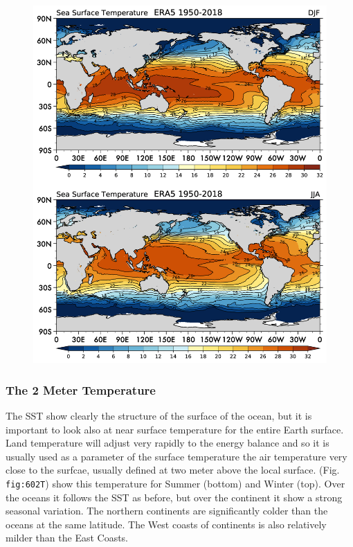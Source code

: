\begin{figure}
\centering
\includegraphics[width = .7 \textwidth]{figs/GD/SST.png}
\caption{}\label{}
\end{figure}

\subsubsection{The 2 Meter Temperature}\label{the-2-meter-temperature}

The SST show clearly the structure of the surface of the ocean, but it
is important to look also at near surface temperature for the entire
Earth surface. Land temperature will adjust very rapidly to the energy
balance and so it is usually used as a parameter of the surface
temperature the air temperature very close to the surfcae, usually
defined at two meter above the local surface. (Fig. \texttt{fig:602T})
show this temperature for Summer (bottom) and Winter (top). Over the
oceans it follows the SST as before, but over the continent it show a
strong seasonal variation. The northern continents are significantly
colder than the oceans at the same latitude. The West coasts of
continents is also relatively milder than the East Coasts.

